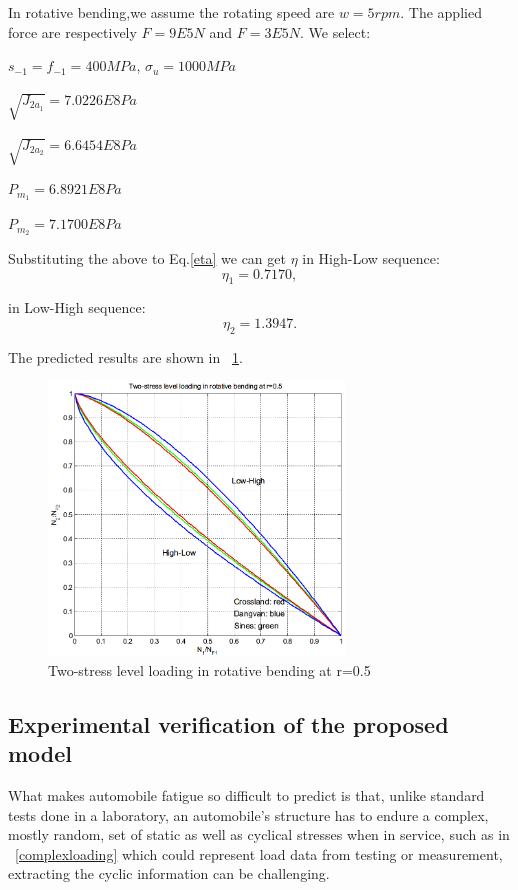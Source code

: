 \documentclass[3p,times,procedia,number]{elsarticle}
\newcommand{\figref}[1]{\figurename~\ref{#1}}
\begin{document}
In rotative bending,we assume the rotating speed are $w=5rpm$. The applied force are respectively $F=9E5 N$ and $F=3E5 N$. We select:

$s_{-1}=f_{-1}=400MPa$, $\sigma_{u}=1000MPa$

\vspace{6pt}
$\sqrt{J_{2a_1}}=7.0226E8 Pa$

\vspace{6pt}
$\sqrt{J_{2a_2}}=6.6454E8 Pa$

\vspace{6pt}
$P_{m_1}=6.8921E8 Pa$

\vspace{6pt}
$P_{m_2}=7.1700E8 Pa$

Substituting the above to Eq.\eqref{eta} we can get $\eta$ in High-Low sequence:
$$\eta_1=0.7170,$$

in Low-High sequence:
$$\eta_2=1.3947.$$

The predicted results are shown in \figref{2stressRB}.

\begin{figure}[h!]
	\centering
	\includegraphics[width=0.7\textwidth]{figures//2stressRB.png} 
	\caption{Two-stress level loading in rotative bending at r=0.5}
	\label{2stressRB}
\end{figure}
\clearpage


\subsection{Experimental verification of the proposed model }

What makes automobile fatigue so difficult to predict is that, unlike standard tests done in a laboratory, an automobile's structure has to endure a complex, mostly random, set of static as well as cyclical stresses when in service, such as in \figref{complexloading} which could represent load data from testing or measurement, extracting the cyclic information can be challenging. 
\end{document}
